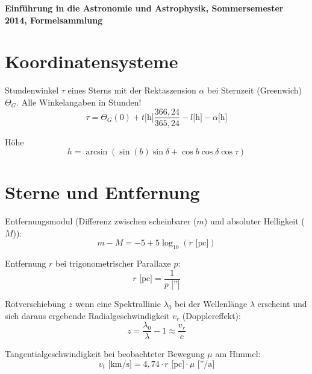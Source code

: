 \documentclass[a4paper,german,12pt,smallheadings,twocolumn]{scrartcl}
\begin{document}
\allowdisplaybreaks %
\begin{center}
\bfseries %
\sffamily %
\vspace{-40pt}
Einführung in die Astronomie und Astrophysik, Sommersemester 2014, Formelsammlung
\vspace{-10pt}
\end{center}
\section*{Koordinatensysteme}
Stundenwinkel $\tau$ eines Sterns mit der Rektaszension $\alpha$ bei Sternzeit
(Greenwich) $\Theta_G$. Alle Winkelangaben in Stunden!
\begin{equation}
  \tau = \Theta_G(0) + t \text{[h]} \frac{366{,}24}{365{,}24} - l \text{[h]} - \alpha \text{[h]}
\end{equation}

Höhe
\begin{equation}
  h = \arcsin(\sin(b) \sin \delta + \cos b \cos \delta \cos \tau)
\end{equation}

\section*{Sterne und Entfernung}

Entfernungsmodul (Differenz zwischen scheinbarer ($m$) und absoluter Helligkeit
($M$)):
\begin{equation}
  m - M = -5 + 5 \log_{10}(r \text{ [pc]})
\end{equation}

Entfernung $r$ bei trigonometrischer Parallaxe $p$:
\begin{equation}
  r\text{ [pc]} = \frac{1}{p\text{ ['']}}
\end{equation}

Rotverschiebung $z$ wenn eine Spektrallinie $\lambda_0$ bei der Wellenlänge
$\lambda$ erscheint und sich daraus ergebende Radialgeschwindigkeit $v_r$
(Dopplereffekt):
\begin{equation}
  z = \frac{\lambda_0}{\lambda} - 1 \approx \frac{v_r}{c}
\end{equation}

Tangentialgeschwindigkeit bei beobachteter Bewegung $\mu$ am Himmel:
\begin{equation}
  v_t \text{ [km/s]} = 4{,}74 \cdot r \text{ [pc]} \cdot \mu \text{ [''/a]}
\end{equation}
\end{document}
